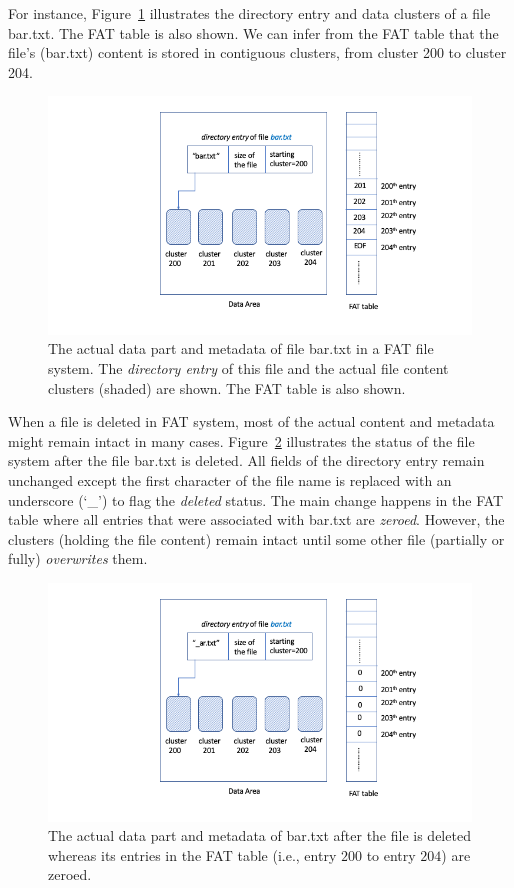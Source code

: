 For instance, Figure~\ref{fig:fat1} illustrates the directory entry and data clusters of 
a file bar.txt. The FAT table is also shown. We can infer from the FAT table that the file's
(bar.txt) content is stored in contiguous clusters, from cluster 200 to cluster 204.


\begin{figure}[h]
     \centering
     \includegraphics[width=\linewidth]{fig/fat1.png}
     \caption{The actual data part and metadata of file bar.txt in a FAT file system. The \emph{directory entry} of this file and the actual file content clusters (shaded) are shown. The FAT table is also shown.}
     \label{fig:fat1}
 \end{figure}

When a file is deleted in FAT system, most of the actual content and metadata might 
remain intact in many cases. 
Figure~\ref{fig:fat2} illustrates the status of the file system after the file bar.txt is deleted.
All fields of the directory entry remain unchanged except the first character of the file name 
is replaced with an underscore (`\_') to flag the \emph{deleted} status. The main change happens in the FAT table where all entries
that were associated with bar.txt are \emph{zeroed}. However, the clusters (holding the file content) 
remain intact until some other file (partially or fully) \emph{overwrites} them. 

  
\begin{figure}[h]
    \centering
    \includegraphics[width=\linewidth]{fig/fat2.png}
    \caption{The actual data part and metadata of bar.txt after the file is deleted whereas its entries in the FAT table (i.e., entry $200$ to entry $204$) are zeroed.}
    \label{fig:fat2}
\end{figure}

